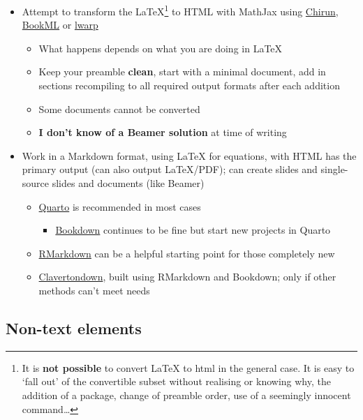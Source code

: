 \documentclass[
  12pt,
  a4-paperpaper,
  DIV=11,
  numbers=noendperiod]{scrartcl}
\providecommand{\tightlist}{%
  \setlength{\itemsep}{0pt}\setlength{\parskip}{0pt}}
\begin{document}
\begin{itemize}
\tightlist
\item
  Attempt to transform the LaTeX\footnote{It is \textbf{not possible} to
    convert LaTeX to html in the general case. It is easy to `fall out'
    of the convertible subset without realising or knowing why, the
    addition of a package, change of preamble order, use of a seemingly
    innocent command\ldots{}} to HTML with MathJax using
  \href{https://chirun.org.uk/}{Chirun},
  \href{https://vlmantova.github.io/bookml/}{BookML} or
  \href{https://ctan.org/pkg/lwarp?lang=en}{lwarp}

  \begin{itemize}
  \tightlist
  \item
    What happens depends on what you are doing in LaTeX
  \item
    Keep your preamble \textbf{clean}, start with a minimal document,
    add in sections recompiling to all required output formats after
    each addition
  \item
    Some documents cannot be converted
  \item
    \textbf{I don't know of a Beamer solution} at time of writing
  \end{itemize}
\item
  Work in a Markdown format, using LaTeX for equations, with HTML has
  the primary output (can also output LaTeX/PDF); can create slides and
  single-source slides and documents (like Beamer)

  \begin{itemize}
  \tightlist
  \item
    \href{https://quarto.org/}{Quarto} is recommended in most cases

    \begin{itemize}
    \tightlist
    \item
      \href{https://bookdown.org/}{Bookdown} continues to be fine but
      start new projects in Quarto
    \end{itemize}
  \item
    \href{https://rmarkdown.rstudio.com/}{RMarkdown} can be a helpful
    starting point for those completely new
  \item
    \href{https://bathmash.github.io/clavertondown/}{Clavertondown},
    built using RMarkdown and Bookdown; only if other methods can't meet
    needs
  \end{itemize}
\end{itemize}

\subsection{Non-text elements}\label{non-text-elements}
\end{document}
